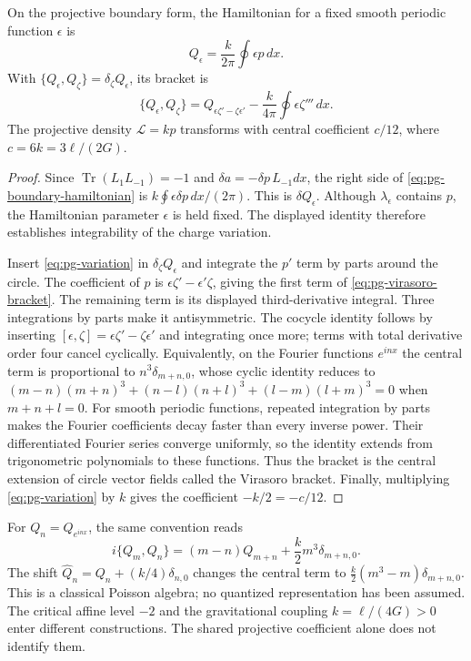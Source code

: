 \begin{proposition}\label{prop:pg-virasoro}
On the projective boundary form, the Hamiltonian for a fixed smooth periodic function $\epsilon$ is
\[
 Q_\epsilon=\frac{k}{2\pi}\oint\epsilon p\,dx.
\]
With $\{Q_\epsilon,Q_\zeta\}=\delta_\zeta Q_\epsilon$, its bracket is
\begin{equation}\label{eq:pg-virasoro-bracket}
 \{Q_\epsilon,Q_\zeta\}
 =Q_{\epsilon\zeta'-\zeta\epsilon'}
   -\frac{k}{4\pi}\oint\epsilon\zeta'''\,dx.
\end{equation}
The projective density $\mathcal L=kp$ transforms with central coefficient $c/12$, where
$c=6k=3\ell/(2G)$.
\end{proposition}
\begin{proof}
Since $\operatorname{Tr}(L_1L_{-1})=-1$ and $\delta a=-\delta p\,L_{-1}dx$,
the right side of \eqref{eq:pg-boundary-hamiltonian} is
$k\oint\epsilon\delta p\,dx/(2\pi)$.
This is $\delta Q_\epsilon$.
Although $\lambda_\epsilon$ contains $p$, the Hamiltonian parameter $\epsilon$ is held fixed.
The displayed identity therefore establishes integrability of the charge variation.

Insert \eqref{eq:pg-variation} in $\delta_\zeta Q_\epsilon$ and integrate the $p'$ term by parts around the circle.
The coefficient of $p$ is $\epsilon\zeta'-\epsilon'\zeta$, giving the first term of \eqref{eq:pg-virasoro-bracket}.
The remaining term is its displayed third-derivative integral.
Three integrations by parts make it antisymmetric.
The cocycle identity follows by inserting
$[\epsilon,\zeta]=\epsilon\zeta'-\zeta\epsilon'$ and integrating once more; terms with total derivative order four cancel cyclically.
Equivalently, on the Fourier functions $e^{inx}$ the central term is proportional to
$n^3\delta_{m+n,0}$, whose cyclic identity reduces to
$(m-n)(m+n)^3+(n-l)(n+l)^3+(l-m)(l+m)^3=0$ when $m+n+l=0$.
For smooth periodic functions, repeated integration by parts makes the Fourier coefficients decay faster than every inverse power.
Their differentiated Fourier series converge uniformly, so the identity extends from trigonometric polynomials to these functions.
Thus the bracket is the central extension of circle vector fields called the Virasoro bracket.
Finally, multiplying \eqref{eq:pg-variation} by $k$ gives the coefficient $-k/2=-c/12$.
\end{proof}

For $Q_n=Q_{e^{inx}}$, the same convention reads
\[
 i\{Q_m,Q_n\}=(m-n)Q_{m+n}+\frac{k}{2}m^3\delta_{m+n,0}.
\]
The shift $\widehat Q_n=Q_n+(k/4)\delta_{n,0}$ changes the central term to
$\tfrac{k}{2}(m^3-m)\delta_{m+n,0}$.
This is a classical Poisson algebra; no quantized representation has been assumed.
The critical affine level $-2$ and the gravitational coupling $k=\ell/(4G)>0$ enter different constructions.
The shared projective coefficient alone does not identify them.

